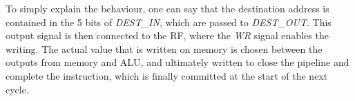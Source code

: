 To simply explain the behaviour, one can say that the destination address is 
contained in the 5 bits of \textit{DEST\_IN}, which are passed to 
\textit{DEST\_OUT}. This output signal is then connected to the \textsc{RF}, 
where the \textit{WR} signal enables the writing. The actual value that is 
written on memory is chosen between the outputs from memory and ALU, and 
ultimately written to close the pipeline and complete the instruction, which is 
finally committed at the start of the next cycle.




